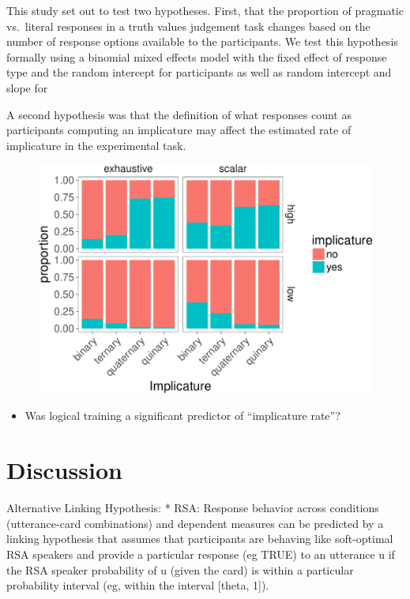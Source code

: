 \documentclass[floatsintext,man]{apa6}
\providecommand{\tightlist}{%
  \setlength{\itemsep}{0pt}\setlength{\parskip}{0pt}}
\theoremstyle{definition}
\theoremstyle{definition}
\theoremstyle{definition}
\theoremstyle{remark}
\begin{document}
This study set out to test two hypotheses. First, that the proportion of
pragmatic vs.~literal responses in a truth values judgement task changes
based on the number of response options available to the participants.
We test this hypothesis formally using a binomial mixed effects model
with the fixed effect of response type and the random intercept for
participants as well as random intercept and slope for

A second hypothesis was that the definition of what responses count as
participants computing an implicature may affect the estimated rate of
implicature in the experimental task.

\begin{figure}
\centering
\includegraphics{writeup_files/figure-latex/implicatureRatePlot-1.pdf}
\caption{}
\end{figure}

\begin{itemize}
\tightlist
\item
  Was logical training a significant predictor of \enquote{implicature
  rate}?
\end{itemize}

\section{Discussion}\label{discussion}

Alternative Linking Hypothesis: * RSA: Response behavior across
conditions (utterance-card combinations) and dependent measures can be
predicted by a linking hypothesis that assumes that participants are
behaving like soft-optimal RSA speakers and provide a particular
response (eg TRUE) to an utterance u if the RSA speaker probability of u
(given the card) is within a particular probability interval (eg, within
the interval {[}theta, 1{]}).
\end{document}
